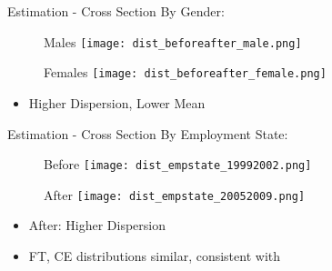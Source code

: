\documentclass{beamer}
\let\oldcite=\cite
\renewcommand{\cite}[1]{\textcolor[rgb]{.0,.2,.7}{\oldcite{#1}}}
\begin{document}
\begin{frame}{Estimation - Cross Section}\label{EstimationCSBA}
By Gender:
\begin{figure}[!t]
\centering
\begin{minipage}[b]{0.48\textwidth}{Males}
\centering
\texttt{[image: dist\_beforeafter\_male.png]}
\end{minipage}
\begin{minipage}[b]{0.48\textwidth}{Females}
\centering
\texttt{[image: dist\_beforeafter\_female.png]}
\end{minipage}
\end{figure}
\begin{itemize}
\setlength{\itemsep}{0.7 cm}
\item Higher Dispersion, Lower Mean
\end{itemize}
\end{frame}

\begin{frame}{Estimation - Cross Section}\label{EstimationCSES}
By Employment State:
\begin{figure}[!t]
\centering
\begin{minipage}[b]{0.48\textwidth}{Before}
\centering
\texttt{[image: dist\_empstate\_19992002.png]}
\end{minipage}
\begin{minipage}[b]{0.48\textwidth}{After}
\centering
\texttt{[image: dist\_empstate\_20052009.png]}
\end{minipage}
\end{figure}
\begin{itemize}
\setlength{\itemsep}{0.7 cm}
\item After: Higher Dispersion
\item FT, CE distributions similar, consistent with \cite{CarriTuRo15}
\end{itemize}
\end{frame}
\end{document}
